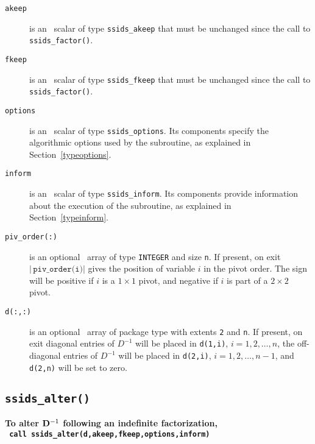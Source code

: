 \documentclass{spral}
\begin{document}
\begin{description}

\item[\texttt{akeep}]  is an \intentin\ scalar of type {\tt ssids\_akeep} that
must be unchanged since the call to {\tt ssids\_factor()}.

\item[\texttt{fkeep}]  is an \intentin\ scalar of type {\tt ssids\_fkeep} that
must be unchanged since the call to {\tt ssids\_factor()}.

\item[\texttt{options}] is an \intentin\ scalar of type {\tt ssids\_options}.
Its components specify the algorithmic options used by the subroutine, as
explained in Section~\ref{typeoptions}.

\item[\texttt{inform}] is an \intentout\ scalar of type
{\tt ssids\_inform}. Its components provide information about the execution
of the subroutine, as explained in Section~\ref{typeinform}.

\item[\texttt{piv\_order(:)}] is an optional \intentout\ array of type
{\tt INTEGER} and size {\tt n}. If present, on exit
$|\,\texttt{piv\_order(i)}|$ gives the position of variable $i$ in the pivot
order. The sign will be positive if $i$ is a $1\times1$ pivot, and negative
if $i$ is part of a $2 \times 2$ pivot.

\item[\texttt{d(:,:)}] is an optional \intentout\ array of package type with
extents {\tt 2} and {\tt n}.
If present, on exit diagonal entries of ${D}^{-1}$ will be placed
in {\tt d(1,i)}, $i = 1,2,\ldots,n$,
the off-diagonal entries  of ${D}^{-1}$ will be placed in
{\tt d(2,i)}, $i = 1,2,\ldots,n-1$, and
{\tt d(2,n)} will be set to zero.

\end{description}



\subsection{\texttt{ssids\_alter()}}
\textbf{To alter ${\bf D}^{-1}$ following an indefinite factorization,
   \vspace*{0.1cm} \\
   \texttt{ \hspace*{0.2cm}
      call ssids\_alter(d,akeep,fkeep,options,inform)
   }
}
\end{document}
